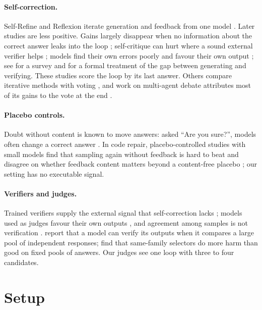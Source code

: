 \documentclass[11pt]{article}
\begin{document}
\paragraph{Self-correction.}
Self-Refine and Reflexion iterate generation and feedback from one model \citep{madaan2023selfrefine,shinn2023reflexion}.
Later studies are less positive.
Gains largely disappear when no information about the correct answer leaks into the loop \citep{huang2024cannot}; self-critique can hurt where a sound external verifier helps \citep{stechly2024selfverification}; models find their own errors poorly \citep{tyen2024cannot} and favour their own output \citep{xu2024pride}; see \citet{kamoi2024when} for a survey and \citet{song2024mindgap} for a formal treatment of the gap between generating and verifying.
These studies score the loop by its last answer.
Others compare iterative methods with voting \citep{bilal2026refining,wang2024token}, and work on multi-agent debate attributes most of its gains to the vote at the end \citep{smit2024mad,choi2025debate}.

\paragraph{Placebo controls.}
Doubt without content is known to move answers: asked ``Are you sure?'', models often change a correct answer \citep{laban2024flipflop}.
In code repair, placebo-controlled studies with small models find that sampling again without feedback is hard to beat and disagree on whether feedback content matters beyond a content-free placebo \citep{iscan2026falsification,iscan2026form,verma2026blind}; our setting has no executable signal.

\paragraph{Verifiers and judges.}
Trained verifiers supply the external signal that self-correction lacks \citep{lightman2024verify}; models used as judges favour their own outputs \citep{zheng2023judging,panickssery2024evaluators}, and agreement among samples is not verification \citep{denisov2026consensus}.
\citet{zhao2025sample} report that a model can verify its outputs when it compares a large pool of independent responses; \citet{hu2026oracle} find that same-family selectors do more harm than good on fixed pools of answers.
Our judges see one loop with three to four candidates.

\section{Setup}
\label{sec:setup}
\end{document}
